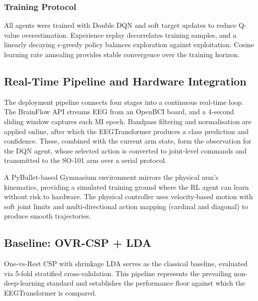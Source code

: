 \documentclass[12pt, a4paper]{article}
\begin{document}
\subsubsection{Training Protocol}

All agents were trained with Double DQN and soft target updates to reduce Q-value overestimation. Experience replay decorrelates training samples, and a linearly decaying $\epsilon$-greedy policy balances exploration against exploitation. Cosine learning rate annealing provides stable convergence over the training horizon.

\subsection{Real-Time Pipeline and Hardware Integration}

The deployment pipeline connects four stages into a continuous real-time loop. The BrainFlow API streams EEG from an OpenBCI board, and a 4-second sliding window captures each MI epoch. Bandpass filtering and normalisation are applied online, after which the EEGTransformer produces a class prediction and confidence. These, combined with the current arm state, form the observation for the DQN agent, whose selected action is converted to joint-level commands and transmitted to the SO-101 arm over a serial protocol.

A PyBullet-based Gymnasium environment mirrors the physical arm's kinematics, providing a simulated training ground where the RL agent can learn without risk to hardware. The physical controller uses velocity-based motion with soft joint limits and multi-directional action mapping (cardinal and diagonal) to produce smooth trajectories.

\subsection{Baseline: OVR-CSP + LDA}

One-vs-Rest CSP with shrinkage LDA serves as the classical baseline, evaluated via 5-fold stratified cross-validation. This pipeline represents the prevailing non-deep-learning standard and establishes the performance floor against which the EEGTransformer is compared.
\end{document}
